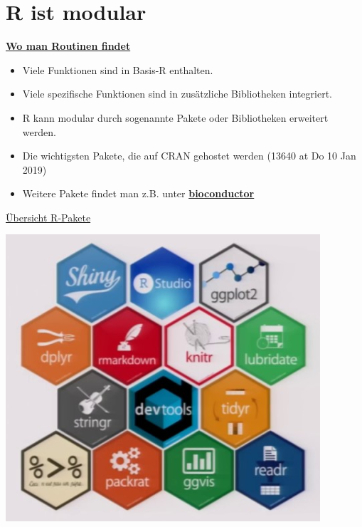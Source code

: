 \documentclass[ignorenonframetext,]{beamer}
\providecommand{\tightlist}{%
  \setlength{\itemsep}{0pt}\setlength{\parskip}{0pt}}
\begin{document}
\hypertarget{r-ist-modular}{%
\section{R ist modular}\label{r-ist-modular}}

\begin{frame}{\href{https://stats.idre.ucla.edu/r/seminars/intro/}{\textbf{Wo
man Routinen findet}}}
\protect\hypertarget{wo-man-routinen-findet}{}

\begin{itemize}
\tightlist
\item
  Viele Funktionen sind in Basis-R enthalten.
\item
  Viele spezifische Funktionen sind in zusätzliche Bibliotheken
  integriert.
\item
  R kann modular durch sogenannte Pakete oder Bibliotheken erweitert
  werden.
\item
  Die wichtigsten Pakete, die auf CRAN gehostet werden (13640 at Do 10
  Jan 2019)
\item
  Weitere Pakete findet man z.B. unter
  \href{www.bioconductor.org}{\textbf{bioconductor}}
\end{itemize}

\end{frame}

\begin{frame}{\href{https://www.youtube.com/watch?v=kKI9--Opmso}{Übersicht
R-Pakete}}
\protect\hypertarget{ubersicht-r-pakete}{}

\includegraphics{figure/packages_overview.PNG}

\end{frame}
\end{document}
